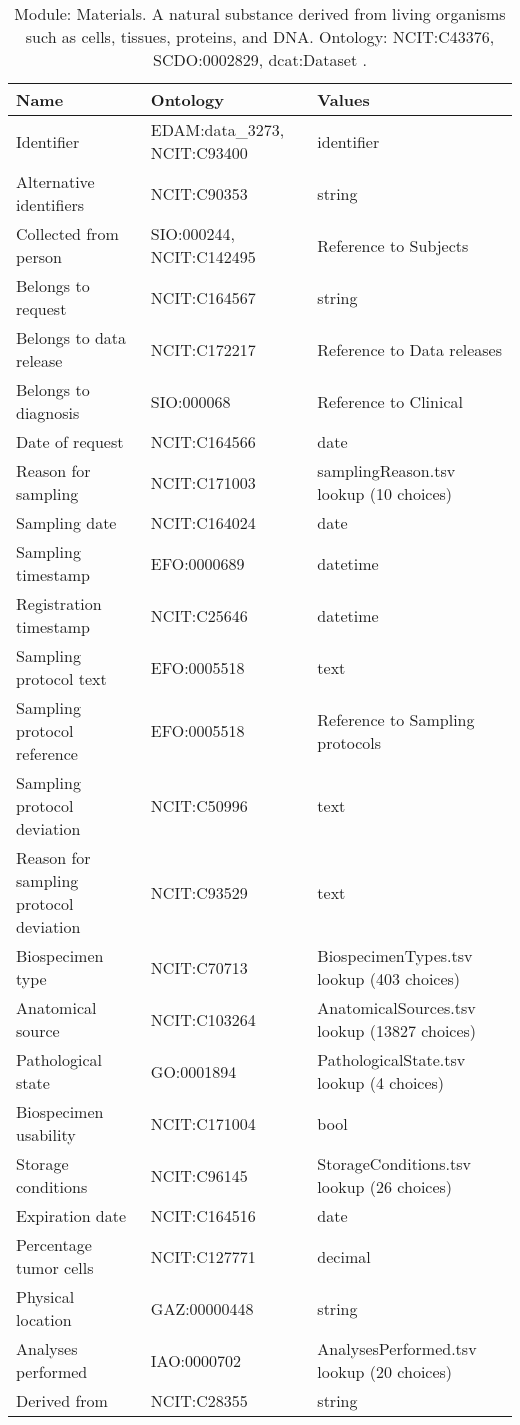 \documentclass{article}
\begin{document}
\begin{table}[htb]
\begin{tabular}{lll}
Name & Ontology & Values \\
\hline
Identifier & EDAM:data\_3273, NCIT:C93400  & identifier \\
Alternative identifiers & NCIT:C90353  & string \\
Collected from person & SIO:000244, NCIT:C142495  & Reference to Subjects \\
Belongs to request & NCIT:C164567  & string \\
Belongs to data release & NCIT:C172217  & Reference to Data releases \\
Belongs to diagnosis & SIO:000068  & Reference to Clinical \\
Date of request & NCIT:C164566  & date \\
Reason for sampling & NCIT:C171003  & samplingReason.tsv lookup (10 choices) \\
Sampling date & NCIT:C164024  & date \\
Sampling timestamp & EFO:0000689  & datetime \\
Registration timestamp & NCIT:C25646  & datetime \\
Sampling protocol text & EFO:0005518  & text \\
Sampling protocol reference & EFO:0005518  & Reference to Sampling protocols \\
Sampling protocol deviation & NCIT:C50996  & text \\
Reason for sampling protocol deviation & NCIT:C93529  & text \\
Biospecimen type & NCIT:C70713  & BiospecimenTypes.tsv lookup (403 choices) \\
Anatomical source & NCIT:C103264  & AnatomicalSources.tsv lookup (13827 choices) \\
Pathological state & GO:0001894  & PathologicalState.tsv lookup (4 choices) \\
Biospecimen usability & NCIT:C171004  & bool \\
Storage conditions & NCIT:C96145  & StorageConditions.tsv lookup (26 choices) \\
Expiration date & NCIT:C164516  & date \\
Percentage tumor cells & NCIT:C127771  & decimal \\
Physical location & GAZ:00000448  & string \\
Analyses performed & IAO:0000702  & AnalysesPerformed.tsv lookup (20 choices) \\
Derived from & NCIT:C28355  & string \\
\hline
\end{tabular}
\caption[Module: Materials]{\label{table:table6} Module: Materials. A natural substance derived from living organisms such as cells, tissues, proteins, and DNA. Ontology: NCIT:C43376, SCDO:0002829, dcat:Dataset . }
\end{table}
\end{document}
